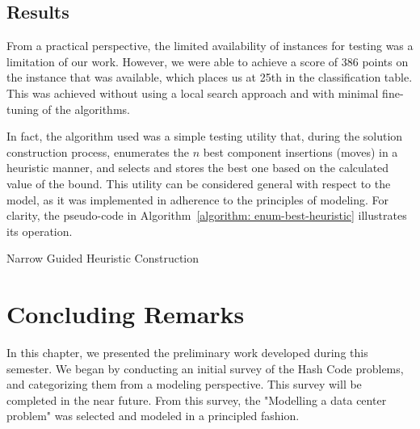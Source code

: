 \subsection{Results} \label{section:data-center-results}

From a practical perspective, the limited availability of instances for testing
was a limitation of our work. However, we were able to achieve a score of 386
points on the instance that was available, which places us at 25th in the
classification table. This was achieved without using a local search approach
and with minimal fine-tuning of the algorithms.

In fact, the algorithm used was a simple testing utility that, during the
solution construction process, enumerates the $n$ best component insertions
(moves) in a heuristic manner, and selects and stores the best one based on the
calculated value of the bound. This utility can be considered general with
respect to the model, as it was implemented in adherence to the principles of
modeling. For clarity, the pseudo-code in Algorithm~\ref{algorithm:
  enum-best-heuristic} illustrates its operation.

\begin{algorithm}[htb!] \DontPrintSemicolon \caption{Narrow Guided Heuristic
    Construction} \label{algorithm:enum-best-heuristic}    \end{algorithm}

\section{Concluding Remarks} \label{section:data-center-remarks}

In this chapter, we presented the preliminary work developed during this
semester. We began by conducting an initial survey of the Hash Code problems,
and categorizing them from a modeling perspective. This survey will be completed
in the near future. From this survey, the "Modelling a data center problem" was
selected and modeled in a principled fashion.

